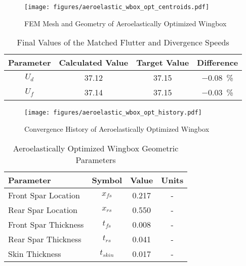 \begin{figure}[H]
    \centering
    \texttt{[image: figures/aeroelastic\_wbox\_opt\_centroids.pdf]}
    \caption{FEM Mesh and Geometry of Aeroelastically Optimized Wingbox}
    \label{fig:aero_wingbox_geom}
\end{figure}

\begin{table}[H]
    \centering
    \caption{Final Values of the Matched Flutter and Divergence Speeds}
    \label{tab:matched_wbox_values}
    \begin{tabularx}{\textwidth}{CCCC} %
    \toprule
    \textbf{Parameter} & \textbf{Calculated Value} &\textbf{Target
    Value} & \textbf{Difference} \\
    \midrule
    $U_d$ & 37.12 & 37.15 & \SI{-0.08}{\percent}\\
    $U_f$ & 37.14 & 37.15 & \SI{-0.03}{\percent}\\ \bottomrule
    \end{tabularx}
\end{table}

\begin{figure}[H]
    \centering
    \texttt{[image: figures/aeroelastic\_wbox\_opt\_history.pdf]}
    \caption{Convergence History of Aeroelastically Optimized Wingbox}
    \label{fig:aero_wingbox_hist}
\end{figure}

\begin{table}[H]
    \centering
    \caption{Aeroelastically Optimized Wingbox Geometric Parameters}
    \label{tab:aeroelastic_wbox_values}
    \begin{tabularx}{\textwidth}{p{}CCC} %
    \toprule
    \textbf{Parameter} & \textbf{Symbol} & \textbf{Value} &\textbf{Units}\\
    \midrule
    Front Spar Location & $x_{fs}$ & 0.217 & \si{-} \\
    Rear Spar Location & $x_{rs}$ & 0.550 & \si{-} \\
    Front Spar Thickness & $t_{fs}$ & 0.008 & \si{-} \\
    Rear Spar Thickness & $t_{rs}$ & 0.041 & \si{-} \\
    Skin Thickness & $t_{skin}$ & 0.017 & \si{-} \\ \bottomrule
    \end{tabularx}
\end{table}


